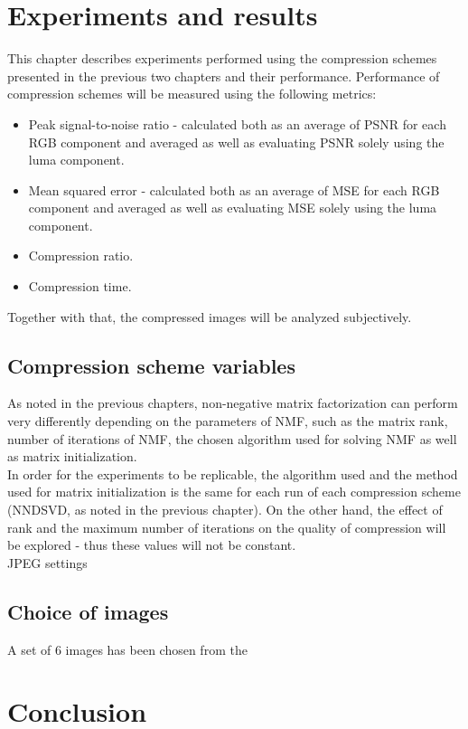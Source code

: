 \documentclass[thesis=M,english]{FITthesis}[2012/10/20]
\begin{document}
\chapter{Experiments and results}
\label{ch:tests}
This chapter describes experiments performed using the compression schemes
presented in the previous two chapters and their performance. Performance of
compression schemes will be measured using the following metrics:
\begin{itemize}
  \item Peak signal-to-noise ratio - calculated both as an average of PSNR
  for each RGB component and averaged as well as evaluating PSNR solely using
  the luma component.
  \item Mean squared error - calculated both as an average of MSE for each
  RGB component and averaged as well as evaluating MSE solely using the luma
  component.
  \item Compression ratio.
  \item Compression time.
\end{itemize}
Together with that, the compressed images will be analyzed subjectively.


\section{Compression scheme variables}
As noted in the previous chapters, non-negative matrix factorization can perform
very differently depending on the parameters of NMF, such as the matrix rank,
number of iterations of NMF, the chosen algorithm used for solving NMF as well
as matrix initialization.
\\

In order for the experiments to be replicable, the algorithm used and the
method used for matrix initialization is the same for each run of each
compression scheme (NNDSVD, as noted in the previous chapter). On the other hand,
the effect of rank and the maximum number of iterations on the quality of compression
will be explored - thus these values will not be constant.
\\

JPEG settings


\section{Choice of images}
A set of 6 images has been chosen from the 


\chapter{Conclusion}
\end{document}
